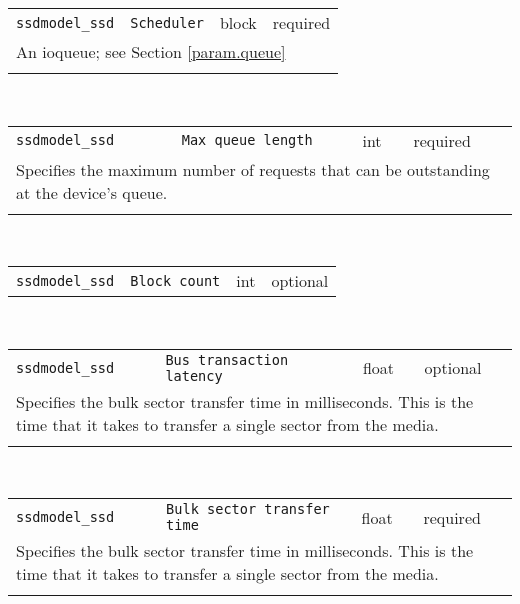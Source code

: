 \noindent 
\begin{tabular}{|p{\lpmodwidth}|p{\lpnamewidth}|p{0.5in}|p{0.5in}|}
\cline{1-4}
\texttt{ssdmodel\_ssd} & \texttt{Scheduler} & block & required \\ 
\cline{1-4}
\multicolumn{4}{|p{6in}|}{
An ioqueue; see Section \ref{param.queue}
}\\ 
\cline{1-4}
\multicolumn{4}{p{5in}}{}\\
\end{tabular}\\ 
\noindent 
\begin{tabular}{|p{\lpmodwidth}|p{\lpnamewidth}|p{0.5in}|p{0.5in}|}
\cline{1-4}
\texttt{ssdmodel\_ssd} & \texttt{Max queue length} & int & required \\ 
\cline{1-4}
\multicolumn{4}{|p{6in}|}{
Specifies the maximum number of requests that can be outstanding at
the device's queue.
}\\ 
\cline{1-4}
\multicolumn{4}{p{5in}}{}\\
\end{tabular}\\ 
\noindent 
\begin{tabular}{|p{\lpmodwidth}|p{\lpnamewidth}|p{0.5in}|p{0.5in}|}
\cline{1-4}
\texttt{ssdmodel\_ssd} & \texttt{Block count} & int & optional \\ 
\cline{1-4}
\end{tabular}\\ 
\noindent 
\begin{tabular}{|p{\lpmodwidth}|p{\lpnamewidth}|p{0.5in}|p{0.5in}|}
\cline{1-4}
\texttt{ssdmodel\_ssd} & \texttt{Bus transaction latency} & float & optional \\ 
\cline{1-4}
\multicolumn{4}{|p{6in}|}{
Specifies the bulk sector transfer time in milliseconds. This is the
time that it takes to transfer a single sector from the media.
}\\ 
\cline{1-4}
\multicolumn{4}{p{5in}}{}\\
\end{tabular}\\ 
\noindent 
\begin{tabular}{|p{\lpmodwidth}|p{\lpnamewidth}|p{0.5in}|p{0.5in}|}
\cline{1-4}
\texttt{ssdmodel\_ssd} & \texttt{Bulk sector transfer time} & float & required \\ 
\cline{1-4}
\multicolumn{4}{|p{6in}|}{
Specifies the bulk sector transfer time in milliseconds. This is the
time that it takes to transfer a single sector from the media.
}\\ 
\cline{1-4}
\multicolumn{4}{p{5in}}{}\\
\end{tabular}\\ 
